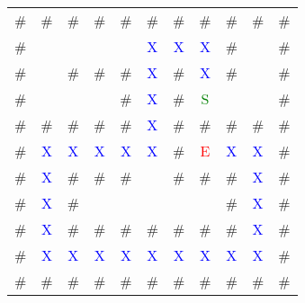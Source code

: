 {
\ttfamily
\setlength{\tabcolsep}{0.3em}
\renewcommand{\arraystretch}{0.75}
\begin{tabular}{ccccccccccc}
\# & \# & \# & \# & \# & \# & \# & \# & \# & \# & \# \\
\# &   &   &   &   & \textcolor{blue}{X} & \textcolor{blue}{X} & \textcolor{blue}{X} & \# &  & \# \\
\# &   & \# & \# & \# & \textcolor{blue}{X} & \# & \textcolor{blue}{X} & \# &   & \# \\
\# &   &   &   & \# & \textcolor{blue}{X} & \# & \textcolor{green}{S} &   &   & \# \\
\# & \# & \# & \# & \# & \textcolor{blue}{X} & \# & \# & \# & \# & \# \\
\# & \textcolor{blue}{X} & \textcolor{blue}{X} & \textcolor{blue}{X} & \textcolor{blue}{X} & \textcolor{blue}{X} & \# & \textcolor{red}{E} & \textcolor{blue}{X} & \textcolor{blue}{X} & \# \\
\# & \textcolor{blue}{X} & \# & \# & \# &   & \# & \# & \# & \textcolor{blue}{X} & \# \\
\# & \textcolor{blue}{X} & \# &   &   &   &   &   & \# & \textcolor{blue}{X} & \# \\
\# & \textcolor{blue}{X} & \# & \# & \# & \# & \# & \# & \# & \textcolor{blue}{X} & \# \\
\# & \textcolor{blue}{X} & \textcolor{blue}{X} & \textcolor{blue}{X} & \textcolor{blue}{X} & \textcolor{blue}{X} & \textcolor{blue}{X} & \textcolor{blue}{X} & \textcolor{blue}{X} & \textcolor{blue}{X} & \# \\
\# & \# & \# & \# & \# & \# & \# & \# & \# & \# & \#
\end{tabular}
}
